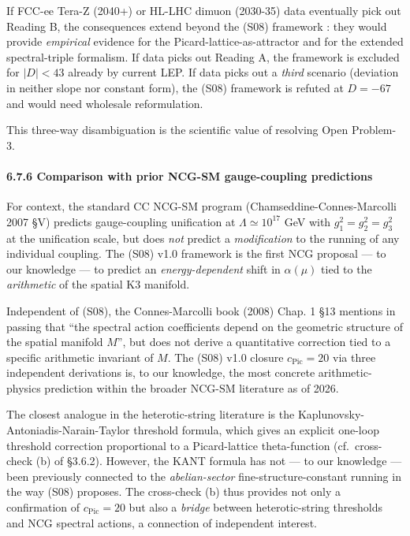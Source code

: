 \documentclass[
  11pt,
  a4paper,
]{article}
\begin{document}
If FCC-ee Tera-Z (2040+) or HL-LHC dimuon (2030-35) data eventually pick out Reading B, the consequences extend beyond the (S08) framework : they would provide \emph{empirical} evidence for the Picard-lattice-as-attractor and for the extended spectral-triple formalism. If data picks out Reading A, the framework is excluded for \(|D| < 43\) already by current LEP. If data picks out a \emph{third} scenario (deviation in neither slope nor constant form), the (S08) framework is refuted at \(D = -67\) and would need wholesale reformulation.

This three-way disambiguation is the scientific value of resolving Open Problem-3.

\hypertarget{comparison-with-prior-ncg-sm-gauge-coupling-predictions}{%
\paragraph{6.7.6 Comparison with prior NCG-SM gauge-coupling predictions}\label{comparison-with-prior-ncg-sm-gauge-coupling-predictions}}

For context, the standard CC NCG-SM program (Chamseddine-Connes-Marcolli 2007 §V) predicts gauge-coupling unification at \(\Lambda \simeq 10^{17}\) GeV with \(g_1^2 = g_2^2 = g_3^2\) at the unification scale, but does \emph{not} predict a \emph{modification} to the running of any individual coupling. The (S08) v1.0 framework is the first NCG proposal --- to our knowledge --- to predict an \emph{energy-dependent} shift in \(\alpha(\mu)\) tied to the \emph{arithmetic} of the spatial K3 manifold.

Independent of (S08), the Connes-Marcolli book (2008) Chap. 1 §13 mentions in passing that ``the spectral action coefficients depend on the geometric structure of the spatial manifold \(M\)'', but does not derive a quantitative correction tied to a specific arithmetic invariant of \(M\). The (S08) v1.0 closure \(c_{\mathrm{Pic}} = 20\) via three independent derivations is, to our knowledge, the most concrete arithmetic-physics prediction within the broader NCG-SM literature as of 2026.

The closest analogue in the heterotic-string literature is the Kaplunovsky-Antoniadis-Narain-Taylor threshold formula, which gives an explicit one-loop threshold correction proportional to a Picard-lattice theta-function (cf.~cross-check (b) of §3.6.2). However, the KANT formula has not --- to our knowledge --- been previously connected to the \emph{abelian-sector} fine-structure-constant running in the way (S08) proposes. The cross-check (b) thus provides not only a confirmation of \(c_{\mathrm{Pic}} = 20\) but also a \emph{bridge} between heterotic-string thresholds and NCG spectral actions, a connection of independent interest.
\end{document}
